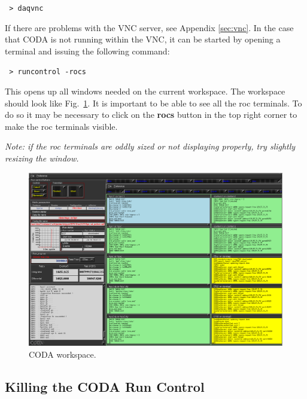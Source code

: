 \documentclass[12pt]{article}
\begin{document}
    \noindent
    \texttt{\hspace*{1cm} > daqvnc}\newline

\noindent
If there are problems with the VNC server, see Appendix \ref{sec:vnc}.  In the case that CODA is not running within the VNC, it can be started by 
opening a terminal and issuing the following command:\newline

    \noindent
    \texttt{\hspace*{1cm} > runcontrol -rocs}\newline

\noindent
This opens up all windows needed on the current workspace. The workspace should
look like Fig.~\ref{fig:coda}. It is important to be able to see all the roc 
terminals.  To do so it may be necessary to click on the {\bf rocs} button in 
the top right corner to make the roc terminals visible. \newline

\noindent
{\em Note:  if the roc terminals are oddly sized or not displaying properly, try slightly resizing the window.}
\begin{figure}[htbp]
\begin{center}
    \includegraphics[width=.8\textwidth]{runcontrol_start.png}
\caption{CODA workspace.}
\label{fig:coda}
\end{center}
\vspace*{-5mm}
\end{figure}

\subsection{Killing the CODA Run Control}\label{sec:daqexit}
\end{document}
